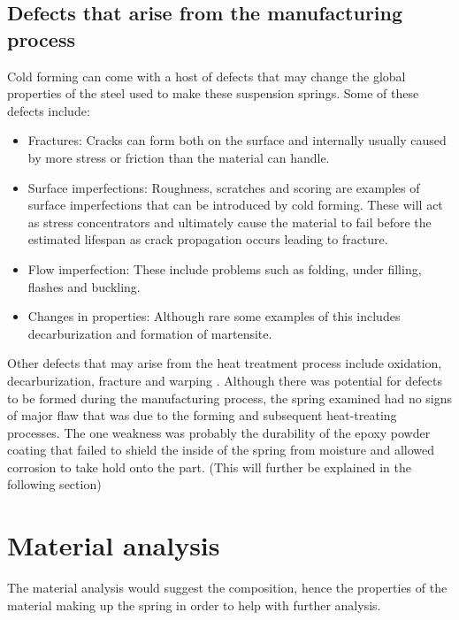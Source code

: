 \documentclass[11pt]{article}
\begin{document}
\subsection{Defects that arise from the manufacturing process}
Cold forming can come with a host of defects that may change the global properties of the steel used to make these suspension springs. Some of these defects include:
\begin{itemize}
	\item Fractures: Cracks can form both on the surface and internally usually caused by more stress or friction than the material can handle.
	\item Surface imperfections: Roughness, scratches and scoring are examples of surface imperfections that can be introduced by cold forming. These will act as stress concentrators and ultimately cause the material to fail before the estimated lifespan as crack propagation occurs leading to fracture.
	\item Flow imperfection: These include problems such as folding, under filling, flashes and buckling.
	\item Changes in properties: Although rare some examples of this includes decarburization and formation of martensite. 
\end{itemize}
Other defects that may arise from the heat treatment process include oxidation, decarburization, fracture and warping \cite{b10}.
Although there was potential for defects to be formed during the manufacturing process, the spring examined had no signs of major flaw that was due to the forming and subsequent heat-treating processes. The one weakness was probably the durability of the epoxy powder coating that failed to shield the inside of the spring from moisture and allowed corrosion to take hold onto the part. (This will further be explained in the following section)
\newpage
\section{Material analysis}
The material analysis would suggest the composition, hence the properties of the material making up the spring in order to help with further analysis.
\end{document}
